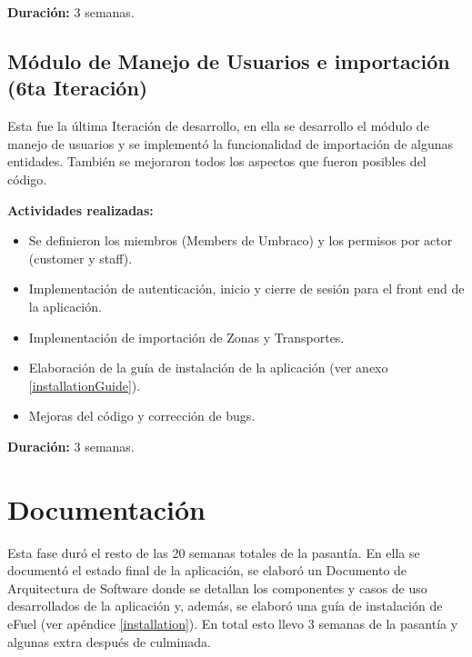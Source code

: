 \textbf{Duración:} 3 semanas.

\subsection{Módulo de Manejo de Usuarios e importación (6ta Iteración)}
Esta fue la última Iteración de desarrollo, en ella se desarrollo el módulo de manejo de usuarios y se implementó la funcionalidad de importación de algunas entidades. También se mejoraron todos los aspectos que fueron posibles del código.

\textbf{Actividades realizadas:}
\begin{itemize}
    \item Se definieron los miembros (Members de Umbraco) y los permisos por actor (customer y staff).
    \item Implementación de autenticación, inicio y cierre de sesión para el front end de la aplicación.
    \item Implementación de importación de Zonas y Transportes.
    \item Elaboración de la guía de instalación de la aplicación (ver anexo \ref{installationGuide}).
    \item Mejoras del código y corrección de bugs.
\end{itemize}

\textbf{Duración:} 3 semanas.

\section{Documentación} \label{documentation}
Esta fase duró el resto de las 20 semanas totales de la pasantía. En ella se documentó el estado final de la aplicación, se elaboró un Documento de Arquitectura de Software donde se detallan los componentes y casos de uso desarrollados de la aplicación y, además, se elaboró una guía de instalación de eFuel (ver apéndice \ref{installation}). En total esto llevo 3 semanas de la pasantía y algunas extra después de culminada.
